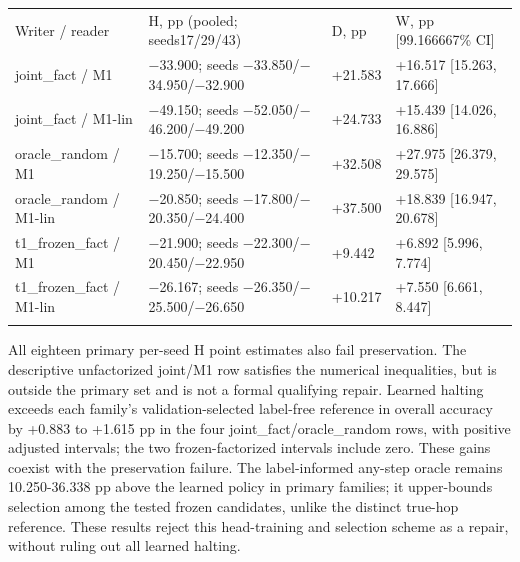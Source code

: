 {\footnotesize
\setlength{\tabcolsep}{3pt}
\begin{longtable}{W{210}{8}W{411}{8}W{134}{8}W{245}{8}}
\toprule
Writer /\allowbreak{} reader & H, pp (pooled; seeds17/\allowbreak{}29/\allowbreak{}43) & D, pp & W, pp [99.166667\% CI] \\ \addlinespace[3pt]
\midrule \endhead
joint\_fact /\allowbreak{} M1 & \ensuremath{-}33.900; seeds \ensuremath{-}33.850/\allowbreak{}\ensuremath{-}34.950/\allowbreak{}\ensuremath{-}32.900 & +21.583 & +16.517 [15.263, 17.666] \\ \addlinespace[3pt]  %
joint\_fact /\allowbreak{} M1-lin & \ensuremath{-}49.150; seeds \ensuremath{-}52.050/\allowbreak{}\ensuremath{-}46.200/\allowbreak{}\ensuremath{-}49.200 & +24.733 & +15.439 [14.026, 16.886] \\ \addlinespace[3pt]  %
oracle\_random /\allowbreak{} M1 & \ensuremath{-}15.700; seeds \ensuremath{-}12.350/\allowbreak{}\ensuremath{-}19.250/\allowbreak{}\ensuremath{-}15.500 & +32.508 & +27.975 [26.379, 29.575] \\ \addlinespace[3pt]  %
oracle\_random /\allowbreak{} M1-lin & \ensuremath{-}20.850; seeds \ensuremath{-}17.800/\allowbreak{}\ensuremath{-}20.350/\allowbreak{}\ensuremath{-}24.400 & +37.500 & +18.839 [16.947, 20.678] \\ \addlinespace[3pt]  %
t1\_frozen\_fact /\allowbreak{} M1 & \ensuremath{-}21.900; seeds \ensuremath{-}22.300/\allowbreak{}\ensuremath{-}20.450/\allowbreak{}\ensuremath{-}22.950 & +9.442 & +6.892 [5.996, 7.774] \\ \addlinespace[3pt]  %
t1\_frozen\_fact /\allowbreak{} M1-lin & \ensuremath{-}26.167; seeds \ensuremath{-}26.350/\allowbreak{}\ensuremath{-}25.500/\allowbreak{}\ensuremath{-}26.650 & +10.217 & +7.550 [6.661, 8.447] \\ \addlinespace[3pt]  %
\bottomrule
\end{longtable}
}


All eighteen primary per-seed H point estimates also fail preservation.  %
The descriptive unfactorized joint/\allowbreak{}M1 row satisfies the numerical inequalities,
but is outside the primary set and is not a formal qualifying repair.  %
Learned halting exceeds each family’s validation-selected label-free reference in
overall accuracy by +0.883 to +1.615 pp in the four joint\_fact/\allowbreak{}oracle\_random rows,
with positive adjusted intervals; the two frozen-factorized intervals include zero.
 These gains coexist with the preservation failure.  %
The label-informed any-step oracle remains 10.250-36.338 pp above the learned policy
in primary families; it upper-bounds selection among the tested frozen candidates,
unlike the distinct true-hop reference. These results reject this  %
head-training and selection scheme as a repair, without ruling out all learned halting.

